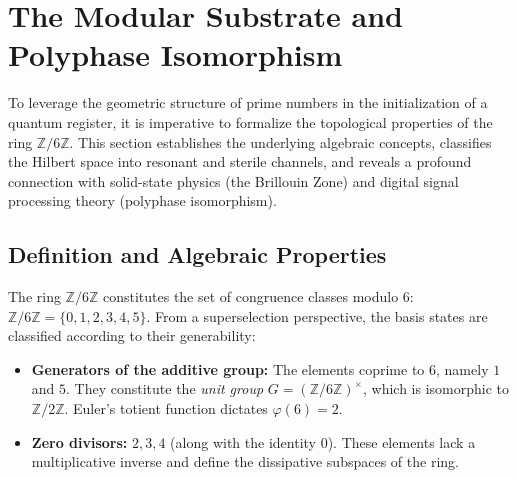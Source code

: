 \documentclass[12pt,a4paper]{article}
\theoremstyle{plain}
\theoremstyle{definition}
\theoremstyle{remark}
\begin{document}
\section{The Modular Substrate and Polyphase Isomorphism}
\label{sec:sustrato_modular}

To leverage the geometric structure of prime numbers in the initialization of a quantum register, it is imperative to formalize the topological properties of the ring $\mathbb{Z}/6\mathbb{Z}$. This section establishes the underlying algebraic concepts, classifies the Hilbert space into resonant and sterile channels, and reveals a profound connection with solid-state physics (the Brillouin Zone) and digital signal processing theory (polyphase isomorphism).

\subsection{Definition and Algebraic Properties}

The ring $\mathbb{Z}/6\mathbb{Z}$ constitutes the set of congruence classes modulo 6: $\mathbb{Z}/6\mathbb{Z} = \{0,1,2,3,4,5\}$. From a superselection perspective, the basis states are classified according to their generability:
\begin{itemize}
    \item \textbf{Generators of the additive group:} The elements coprime to 6, namely $1$ and $5$. They constitute the \textit{unit group} $G = (\mathbb{Z}/6\mathbb{Z})^{\times}$, which is isomorphic to $\mathbb{Z}/2\mathbb{Z}$. Euler's totient function dictates $\varphi(6)=2$.
    \item \textbf{Zero divisors:} $2,3,4$ (along with the identity $0$). These elements lack a multiplicative inverse and define the dissipative subspaces of the ring.
\end{itemize}
\end{document}
